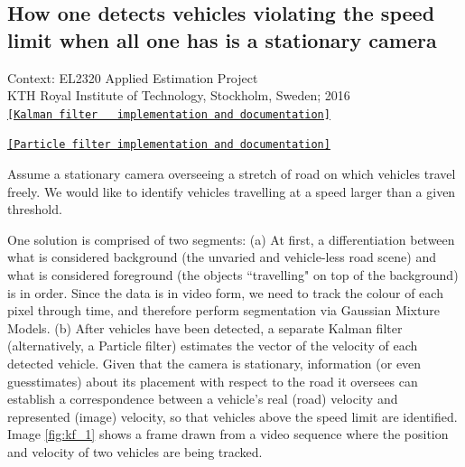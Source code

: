 \subsection{How one detects vehicles violating the speed limit when
all one has is a stationary camera}

\noindent Context: EL2320 Applied Estimation Project\\
\noindent KTH Royal Institute of Technology, Stockholm, Sweden; 2016\\

\noindent \href{https://github.com/li9i/HT15_P2_EL2320_Lab_1}{\texttt{[Kalman filter \ \ implementation and documentation]}}

 \noindent \href{https://github.com/li9i/HT15_P2_EL2320_Lab_2}{\texttt{[Particle filter implementation and documentation]}}\\


\begin{problem}
Assume a stationary camera overseeing a stretch of road on
which vehicles travel freely. We would like to identify vehicles travelling at
a speed larger than a given threshold.
\end{problem}

One solution is comprised of two segments: (a) At first, a differentiation
between what is considered background (the unvaried and vehicle-less road scene)
and what is considered foreground (the objects ``travelling" on top of the
background) is in order. Since the data is in video form, we need to track
the colour of each pixel through time, and therefore perform segmentation via
Gaussian Mixture Models. (b) After vehicles have been detected, a separate
Kalman filter (alternatively, a Particle filter) estimates the vector of the
velocity of each detected vehicle. Given that the camera is stationary,
information (or even guesstimates) about its placement with respect to the
road it oversees can establish a correspondence between a vehicle's real (road)
velocity and represented (image) velocity, so that vehicles above the speed
limit are identified. Image \ref{fig:kf_1} shows a frame drawn from a video
sequence where the position and velocity of two vehicles are being tracked.

